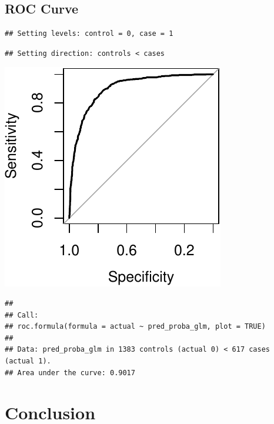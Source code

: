\documentclass{article}
\begin{document}
\hypertarget{roc-curve}{%
\subsection{ROC Curve}\label{roc-curve}}

\begin{verbatim}
## Setting levels: control = 0, case = 1
\end{verbatim}

\begin{verbatim}
## Setting direction: controls < cases
\end{verbatim}

\includegraphics{report_files/figure-latex/unnamed-chunk-18-1.pdf}

\begin{verbatim}
## 
## Call:
## roc.formula(formula = actual ~ pred_proba_glm, plot = TRUE)
## 
## Data: pred_proba_glm in 1383 controls (actual 0) < 617 cases (actual 1).
## Area under the curve: 0.9017
\end{verbatim}

\hypertarget{conclusion}{%
\section{Conclusion}\label{conclusion}}



\end{document}
